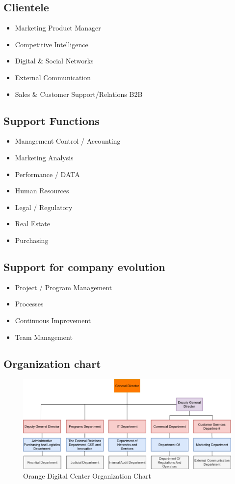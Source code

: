 \subsection{Clientele}
\begin{itemize}
      \item Marketing Product Manager
      \item Competitive Intelligence
      \item Digital \& Social Networks
      \item External Communication
      \item Sales \& Customer Support/Relations B2B
\end{itemize}

\subsection{Support Functions}
\begin{itemize}
      \item Management Control / Accounting
      \item Marketing Analysis
      \item Performance / DATA
      \item Human Resources
      \item Legal / Regulatory
      \item Real Estate
      \item Purchasing
\end{itemize}

\subsection{Support for company evolution}
\begin{itemize}
      \item Project / Program Management
      \item Processes
      \item Continuous Improvement
      \item Team Management
\end{itemize}

\subsection{Organization chart}
\begin{figure}[h!]
      \centering
      \includegraphics[width=1\textwidth]{images/orgChart.png}
      \caption{Orange Digital Center Organization Chart}
      \label{fig:Orange Digital Center Organization Chart}
\end{figure}

